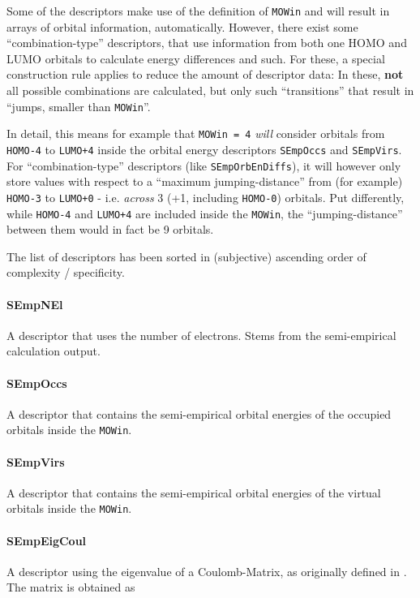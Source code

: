 \documentclass[12pt]{achemso}
\begin{document}
\noindent Some of the descriptors make use of the definition of \verb+MOWin+ and will result in arrays of orbital information, automatically. However, there exist some ``combination-type'' descriptors, that use information from both one HOMO and LUMO orbitals to calculate energy differences and such. For these, a special construction rule applies to reduce the amount of descriptor data: In these, \textbf{not} all possible combinations are calculated, but only such ``transitions'' that result in ``jumps, smaller than \verb+MOWin+''.

\noindent In detail, this means for example that \verb+MOWin = 4+ \textit{will} consider orbitals from \verb+HOMO-4+ to \verb-LUMO+4- inside the orbital energy descriptors \verb+SEmpOccs+ and \verb+SEmpVirs+. For ``combination-type'' descriptors (like \verb+SEmpOrbEnDiffs+), it will however only store values with respect to a ``maximum jumping-distance'' from (for example) \verb+HOMO-3+ to \verb-LUMO+0- - i.e. \textit{across} 3 (+1, including \verb+HOMO-0+) orbitals. Put differently, while \verb+HOMO-4+ and \verb-LUMO+4- are included inside the \verb+MOWin+, the ``jumping-distance'' between them would in fact be 9 orbitals.

\noindent The list of descriptors has been sorted in (subjective) ascending order of complexity / specificity.

\paragraph{SEmpNEl}
A descriptor that uses the number of electrons. Stems from the semi-empirical calculation output.

\paragraph{SEmpOccs}
A descriptor that contains the semi-empirical orbital energies of the occupied orbitals inside the \verb+MOWin+.

\paragraph{SEmpVirs}
A descriptor that contains the semi-empirical orbital energies of the virtual orbitals inside the \verb+MOWin+.

\paragraph{SEmpEigCoul} 
A descriptor using the eigenvalue of a Coulomb-Matrix, as originally defined in \cite{Rupp2012}. The matrix is obtained as
\end{document}
